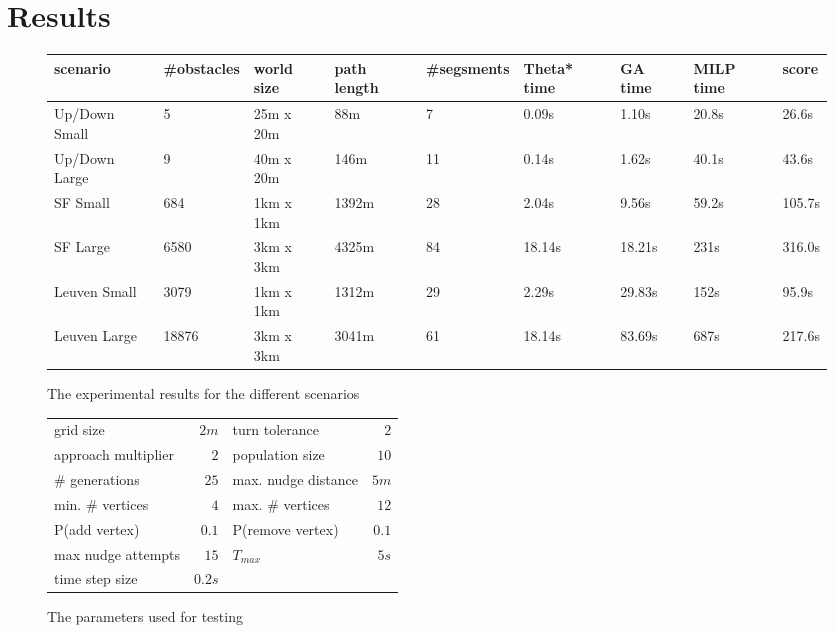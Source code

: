 \section{Results}
\begin{figure}
\begin{tabular}{ l l l l l l l l l }
 scenario & \#obstacles & world size & path length & \#segsments & Theta* time & GA time & MILP time & score \\ 
 \hline
Up/Down Small & 5 &  25m x 20m & 88m  & 7 & 0.09s & 1.10s & 20.8s & 26.6s\\
Up/Down Large & 9 & 40m x 20m &  146m & 11 & 0.14s & 1.62s & 40.1s & 43.6s \\
SF Small & 684 & 1km x 1km & 1392m & 28 & 2.04s & 9.56s & 59.2s & 105.7s \\
SF Large & 6580 & 3km x 3km & 4325m  & 84 & 18.14s & 18.21s & 231s & 316.0s\\
Leuven Small & 3079 & 1km x 1km & 1312m & 29 &  2.29s & 29.83s & 152s  & 95.9s \\
Leuven Large & 18876 & 3km x 3km & 3041m & 61 & 18.14s & 83.69s & 687s & 217.6s \\

\end{tabular}
\caption{The experimental results for the different scenarios}
\label{table:results}
\end{figure}

\begin{figure}
\begin{tabular}{ l  r | l r }
grid size 			& $2m$ 	& turn tolerance 		& $2$ \\
approach multiplier & $2$ 	& population size 		& $ 10$ \\
\# generations 		& $25$ 	& max. nudge distance 	& $5m$\\
min. \# vertices 	& $ 4$ 	& max. \# vertices 		& $12$ \\
P(add vertex) 		& $0.1$ & P(remove vertex) 		& $0.1$  \\
max nudge attempts 	& $15$ 	& $ T_{max}$ 			& $5s$ \\
time step size 		& $0.2s$& &
\end{tabular}
\caption{The parameters used for testing}
\label{table:params}
\end{figure}

